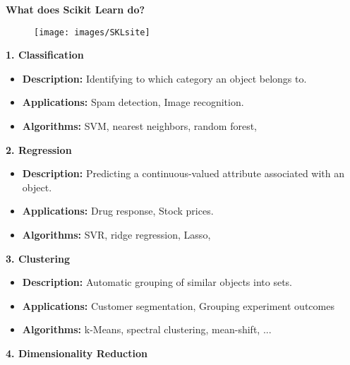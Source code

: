 \documentclass[SKL-MASTER.tex]{subfiles}
\begin{document}
	\LARGE
\textbf{What does Scikit Learn do?}\\
\begin{figure}[h!]
	\centering
	\texttt{[image: images/SKLsite]}
	
\end{figure}
\newpage
\LARGE
\noindent \textbf{1. Classification}
\begin{itemize}
	\item \noindent \textbf{Description:} Identifying to which category an object belongs to.
	\item \noindent \textbf{Applications:} Spam detection, Image recognition.
	\item \noindent \textbf{Algorithms:} SVM, nearest neighbors, random forest, 
\end{itemize}

\bigskip
\noindent \textbf{2. Regression}
\begin{itemize}
	\item \noindent \textbf{Description:} Predicting a continuous-valued attribute associated with an object.
	\item \noindent \textbf{Applications:} Drug response, Stock prices.
	\item \noindent \textbf{Algorithms:} SVR, ridge regression, Lasso, 
	
\end{itemize}
\bigskip
\noindent \textbf{3. Clustering}

\begin{itemize}
	\item \noindent \textbf{Description: } Automatic grouping of similar objects into sets.
	\item \noindent \textbf{Applications:} Customer segmentation, Grouping experiment outcomes
	\item \noindent \textbf{Algorithms:} k-Means, spectral clustering, mean-shift, ...
\end{itemize}

\newpage
\noindent \textbf{4. Dimensionality Reduction}
\end{document}
